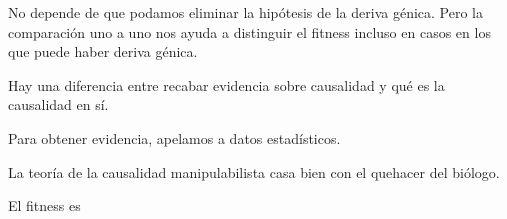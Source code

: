 No depende de que podamos eliminar la hipótesis de la deriva génica. Pero la comparación uno a uno nos ayuda a distinguir el fitness incluso en casos en los que puede haber deriva génica.



Hay una diferencia entre recabar evidencia sobre causalidad y qué es la causalidad en sí.

Para obtener evidencia, apelamos a datos estadísticos.

La teoría de la causalidad manipulabilista casa bien con el quehacer del biólogo.

El fitness es
